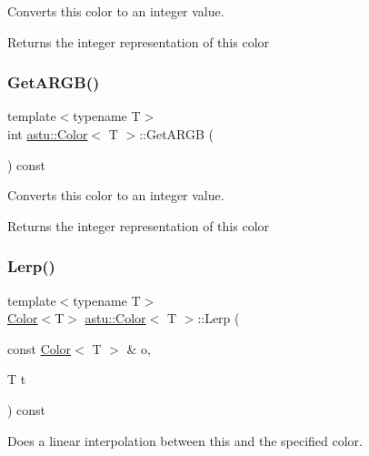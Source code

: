 Converts this color to an integer value.

\begin{DoxyReturn}{Returns}
the integer representation of this color 
\end{DoxyReturn}
\mbox{\label{classastu_1_1Color_aa7c679fe7a6c4b11ea163bc1d64fd73b}} 
\subsubsection{\texorpdfstring{Get\+A\+R\+G\+B()}{GetARGB()}}
{\footnotesize\ttfamily template$<$typename T$>$ \\
int \hyperlink{classastu_1_1Color}{astu\+::\+Color}$<$ T $>$\+::Get\+A\+R\+GB (\begin{DoxyParamCaption}{ }\end{DoxyParamCaption}) const\hspace{0.3cm}{\ttfamily [inline]}}

Converts this color to an integer value.

\begin{DoxyReturn}{Returns}
the integer representation of this color 
\end{DoxyReturn}
\mbox{\label{classastu_1_1Color_acc63e1fac50adf874fa5b33516186e7f}} 
\subsubsection{\texorpdfstring{Lerp()}{Lerp()}}
{\footnotesize\ttfamily template$<$typename T$>$ \\
\hyperlink{classastu_1_1Color}{Color}$<$T$>$ \hyperlink{classastu_1_1Color}{astu\+::\+Color}$<$ T $>$\+::Lerp (\begin{DoxyParamCaption}\item[{const \hyperlink{classastu_1_1Color}{Color}$<$ T $>$ \&}]{o,  }\item[{T}]{t }\end{DoxyParamCaption}) const\hspace{0.3cm}{\ttfamily [inline]}}

Does a linear interpolation between this and the specified color.


